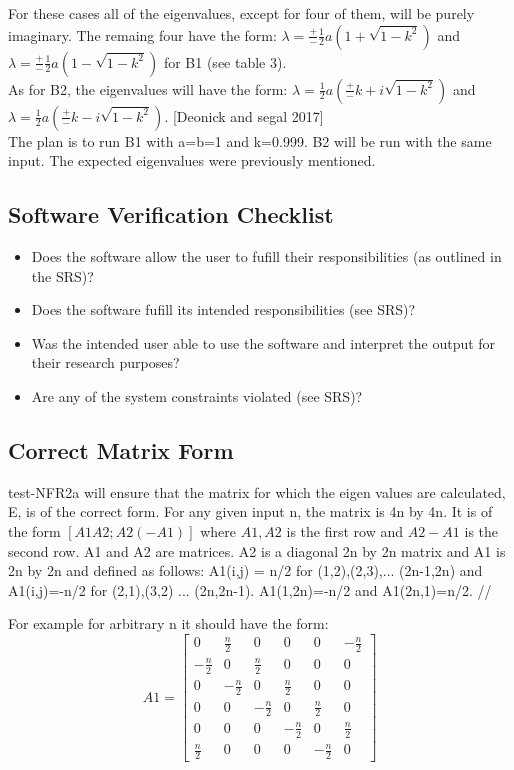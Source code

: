 \documentclass[12pt, titlepage]{article}
\begin{document}
For these cases all of the eigenvalues, except for four of them, will be purely 
imaginary. The remaing four have the form: $\lambda = \frac{+}{-} \frac{1}{2} a 
(1+\sqrt{1-k^{2}})$ and $\lambda = \frac{+}{-} \frac{1}{2} a 
(1-\sqrt{1-k^{2}})$ for B1 (see table 3). \\ 
As for B2, the eigenvalues will have the form:  $\lambda =  \frac{1}{2} a 
(\frac{+}{-}k+ i \sqrt{1-k^{2}})$ and $\lambda = \frac{1}{2} a 
(\frac{+}{-}k - i \sqrt{1-k^{2}})$. [Deonick and segal 2017] \\ 
The plan is to run B1 with a=b=1 and k=0.999. B2 will be run with the same 
input. The expected eigenvalues were previously mentioned. 

\subsection{Software Verification Checklist} 
\label{softwarevercheck}
\begin{itemize}
	\item Does the software allow the user to fufill their responsibilities 
	(as outlined in the SRS)?
	\item Does the software fufill its intended responsibilities (see SRS)?
	\item Was the intended user able to use the software and interpret the 
	output for their research purposes?
	\item Are any of the system constraints violated (see SRS)?
\end{itemize}  

\newpage	
\subsection{Correct Matrix Form} 
\label{matrixform}
test-NFR2a will ensure that the matrix for which the eigen values are 
calculated, E, is of the correct form. For any given input n, the matrix is 4n 
by 4n. It is of the form $ [A1 A2; A2 (-A1)] $ where $ A1, A2$ is the first 
row 
and $A2 -A1$ is the second row. A1 and A2 are matrices. A2 is a diagonal 2n by 
2n matrix and A1 is 2n by 2n and defined as follows: A1(i,j) = n/2 for 
(1,2),(2,3),... (2n-1,2n) and A1(i,j)=-n/2 for (2,1),(3,2) ... (2n,2n-1). 
A1(1,2n)=-n/2 and A1(2n,1)=n/2. // 

For example for arbitrary n it should have the form: 
\[
A1=
\begin{bmatrix}
0 & \frac{n}{2} & 0 & 0 & 0 &-\frac{n}{2}\\
-\frac{n}{2} & 0 & \frac{n}{2} & 0 & 0 &0\\
0 & -\frac{n}{2} & 0 & \frac{n}{2} & 0 &0\\
0 & 0 & -\frac{n}{2} & 0 & \frac{n}{2} &0\\
0 & 0 & 0 & -\frac{n}{2} & 0 &\frac{n}{2} \\ 
\frac{n}{2} & 0 & 0 & 0 & -\frac{n}{2} & 0 
\end{bmatrix}
\] 
\end{document}
